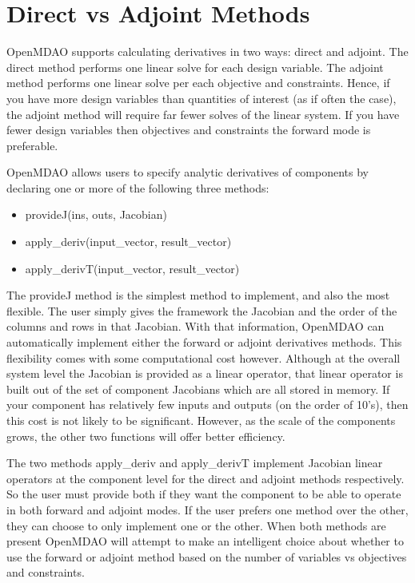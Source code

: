 \documentclass[]{aiaa-tc} %
\begin{document}
    \section{Direct vs Adjoint Methods}

    OpenMDAO supports calculating derivatives in two ways: direct and adjoint. The direct method performs
    one linear solve for each design variable. The adjoint method performs one linear solve per each objective
    and constraints. Hence, if you have more design variables than quantities of interest (as if often the case),
    the adjoint method will require far fewer solves of the linear system. If you have fewer design variables then
    objectives and constraints the forward mode is preferable.

    OpenMDAO allows users to specify analytic derivatives of components by declaring one or more of the following three
    methods:

    \begin{itemize}
        \item provideJ(ins, outs, Jacobian)
        \item apply\_deriv(input\_vector, result\_vector)
        \item apply\_derivT(input\_vector, result\_vector)
    \end{itemize}

    The provideJ method is the simplest method to implement, and also the most flexible. The user simply gives the framework the
    Jacobian and the order of the columns and rows in that Jacobian. With that information, OpenMDAO can automatically
    implement either the forward or adjoint derivatives methods. This flexibility comes with some computational cost however.
    Although at the overall system level the Jacobian is provided as a linear operator, that linear operator is built out
    of the set of component Jacobians which are all stored in memory. If your component has relatively few inputs and outputs
    (on the order of 10's), then this cost is not likely to be significant. However, as the scale of the components grows,
    the other two functions will offer better efficiency.

    The two methods apply\_deriv and apply\_derivT implement Jacobian linear operators at
    the component level for the direct and adjoint methods respectively. So the user must provide both if they
    want the component to be able to operate in both forward and adjoint modes. If the user prefers one method over
    the other, they can choose to only implement one or the other. When both methods are present OpenMDAO will
    attempt to make an intelligent choice about whether to use the forward or adjoint method based on the number
    of variables vs objectives and constraints.
\end{document}
